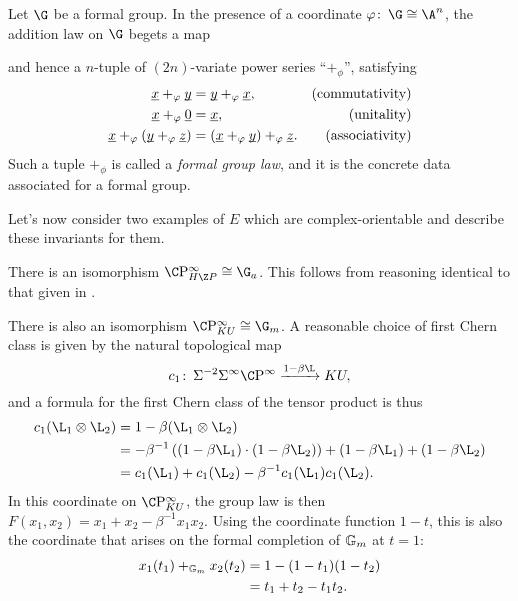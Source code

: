 \begin{definition}\label{FGLDefinition}
Let $\G$ be a formal group.  In the presence of a coordinate $\phi \co \G \cong \A^n$, the addition law on $\G$ begets a map
\begin{center}
 
\end{center}
and hence a $n$-tuple of $(2n)$-variate power series ``$+_\phi$'', satisfying
\begin{align*}
\underline{\smash x} +_\phi \underline{\smash y} & = \underline{\smash y} +_\phi \underline{\smash x}, & \text{(commutativity)} \\
\underline{\smash x} +_\phi \underline{\smash 0} & = \underline{\smash x}, & \text{(unitality)} \\
\underline{\smash x} +_\phi (\underline{\smash y} +_\phi \underline{\smash z}) & = (\underline{\smash x} +_\phi \underline{\smash y}) +_\phi \underline{\smash z}. & \text{(associativity)}
\end{align*}
Such a tuple $+_\phi$ is called a \textit{formal group law}, and it is the concrete data associated for a formal group.
\end{definition}

Let's now consider two examples of $E$ which are complex-orientable and describe these invariants for them.

\begin{example}
There is an isomorphism $\CP^\infty_{H\Z P} \cong \G_a$.  This follows from reasoning identical to that given in .
\end{example}

\begin{example}\label{CPinftyKUExample}
There is also an isomorphism $\CP^\infty_{KU} \cong \G_m$.  A reasonable choice of first Chern class is given by the natural topological map \[c_1\co \Susp^{-2} \Susp^\infty \CP^\infty \xrightarrow{1 - \beta \L} KU,\] and a formula for the first Chern class of the tensor product is thus
\begin{align*}
c_1(\L_1 \otimes \L_2) & = 1 - \beta(\L_1 \otimes \L_2) \\
& = -\beta^{-1} \left( (1 - \beta \L_1) \cdot (1 - \beta \L_2) \right) + (1 - \beta \L_1) + (1 - \beta \L_2) \\
& = c_1(\L_1) + c_1(\L_2) - \beta^{-1} c_1(\L_1) c_1(\L_2).
\end{align*}
In this coordinate on $\CP^\infty_{KU}$, the group law is then $F(x_1, x_2) = x_1 + x_2 - \beta^{-1} x_1 x_2$.  Using the coordinate function $1 - t$, this is also the coordinate that arises on the formal completion of $\Gm$ at $t = 1$:
\begin{align*}
x_1(t_1) +_{\Gm} x_2(t_2) & = 1 - (1 - t_1)(1 - t_2) \\
& = t_1 + t_2 - t_1 t_2.
\end{align*}
\end{example}

